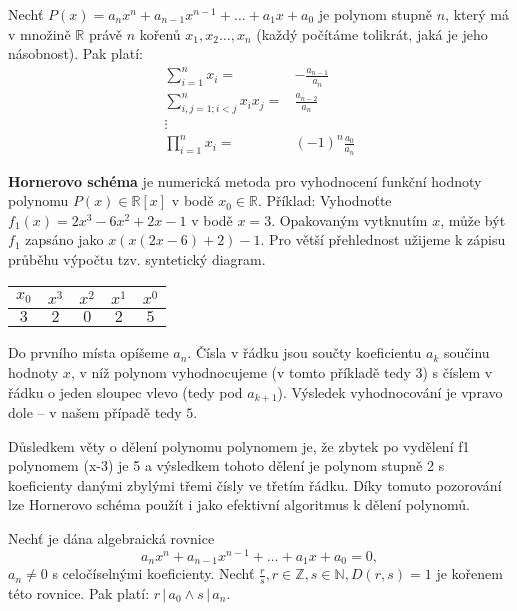 \begin{veta}
  Nechť $P(x)=a_nx^n+a_{n-1}x^{n-1}+\dots + a_1x+a_0$ je polynom stupně $n$, který má v množině $\mathbb R$ právě $n$ kořenů $x_1,x_2\dots,x_n$ (každý počítáme tolikrát, jaká je jeho násobnost). Pak platí:
  \begin{align*}
    \sum_{i=1}^n x_i = & -\frac{a_{n-1}}{a_n} \\
    \sum_{i,j=1; i<j}^{n}x_ix_j= & \frac{a_{n-2}}{a_n} \\
    \vdots & \\
    \prod_{i=1}^nx_i=&(-1)^n\frac{a_0}{a_n}
  \end{align*}
\end{veta}

\begin{pozn}
  \textbf{Hornerovo schéma} je numerická metoda pro vyhodnocení funkční hodnoty polynomu $P(x) \in \mathbb R [x]$ v bodě $ x_0 \in \mathbb R$. Příklad:
  Vyhodnoťte $f_{1}(x)=2x^{3}-6x^{2}+2x-1$ v bodě $x=3$.
  Opakovaným vytknutím $x$, může být $f_{1}$ zapsáno jako $x(x(2x-6)+2)-1$. Pro větší přehlednost užijeme k zápisu průběhu výpočtu tzv. syntetický diagram.
  \begin{center}
    \begin{tabular}{ c|c c c c }
        $x_{0}$ & $x^{3}$ & $x^{2}$ & $x^{1}$ & $x^{0}$\\
        \hline
        $3$ & $2$ & $0$ & $2$ & $5$
    \end{tabular}
  \end{center}
  Do prvního místa opíšeme $a_n$. Čísla v řádku jsou součty koeficientu $a_k$ součinu hodnoty $x$, v níž polynom vyhodnocujeme (v tomto příkladě tedy $3$) s číslem v řádku o jeden sloupec vlevo (tedy pod $a_{k+1}$). Výsledek vyhodnocování je vpravo dole – v našem případě tedy $5$.

  Důsledkem věty o dělení polynomu polynomem je, že zbytek po vydělení f1 polynomem (x-3) je 5 a výsledkem tohoto dělení je polynom stupně 2 s koeficienty danými zbylými třemi čísly ve třetím řádku. Díky tomuto pozorování lze Hornerovo schéma použít i jako efektivní algoritmus k dělení polynomů.
\end{pozn}

\begin{veta}
    Nechť je dána algebraická rovnice
    \begin{equation}\label{alg_rce}
        a_nx^n + a_{n-1}x^{n-1}+\dots + a_1x+a_0=0,
    \end{equation}
    $a_n \ne 0$ s celočíselnými koeficienty. Nechť $\frac{r}{s}, r\in \mathbb Z, s \in \mathbb N, D(r,s)=1$ je kořenem této rovnice.
    Pak platí: $r \, | \, a_0 \land s \, |\, a_n.$
\end{veta}


